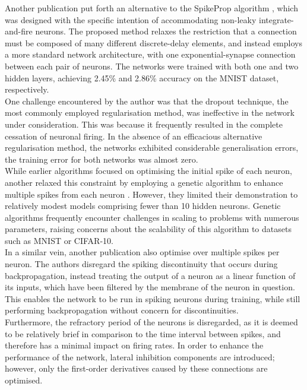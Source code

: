 \noindent Another publication put forth an alternative to the SpikeProp algorithm \cite{mostafa2017supervised}, which was designed with the specific intention of accommodating non-leaky integrate-and-fire neurons. The proposed method relaxes the restriction that a connection must be composed of many different discrete-delay elements, and instead employs a more standard network architecture, with one exponential-synapse connection between each pair of neurons. The networks were trained with both one and two hidden layers, achieving 2.45\% and 2.86\% accuracy on the MNIST dataset, respectively. \\

\noindent One challenge encountered by the author was that the dropout technique, the most commonly employed regularisation method, was ineffective in the network under consideration. This was because it frequently resulted in the complete cessation of neuronal firing. In the absence of an efficacious alternative regularisation method, the networks exhibited considerable generalisation errors, the training error for both networks was almost zero.\\

\noindent While earlier algorithms focused on optimising the initial spike of each neuron, another relaxed this constraint by employing a genetic algorithm to enhance multiple spikes from each neuron \cite{stromatias2015supervised}. However, they limited their demonstration to relatively modest models comprising fewer than 10 hidden neurons. Genetic algorithms frequently encounter challenges in scaling to problems with numerous parameters, raising concerns about the scalability of this algorithm to datasets such as MNIST or CIFAR-10.\\

\noindent In a similar vein, another publication \cite{lee2016training} also optimise over multiple spikes per neuron. The authors disregard the spiking discontinuity that occurs during backpropagation, instead treating the output of a neuron as a linear function of its inputs, which have been filtered by the membrane of the neuron in question. This enables the network to be run in spiking neurons during training, while still performing backpropagation without concern for discontinuities. \\

\noindent Furthermore, the refractory period of the neurons is disregarded, as it is deemed to be relatively brief in comparison to the time interval between spikes, and therefore has a minimal impact on firing rates. In order to enhance the performance of the network, lateral inhibition components are introduced; however, only the first-order derivatives caused by these connections are optimised. \\

